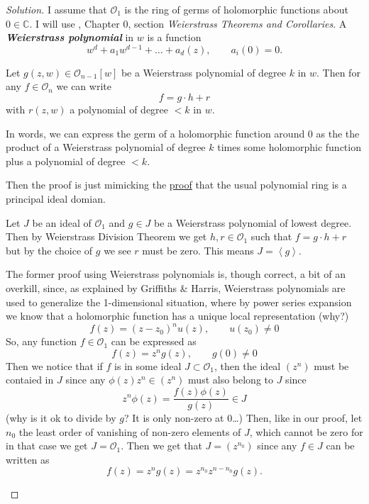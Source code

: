 \begin{proof}[Solution]\leavevmode
	I assume that $\mathcal{O}_1$ is the ring of germs of holomorphic functions about $0\in\mathbb{C}$. I will use \cite{gri}, Chapter 0, section \textit{Weierstrass Theorems and Corollaries}. A \textit{\textbf{Weierstrass polynomial}} in $w$ is a function
	\[w^d+a_1w^{d-1}+\ldots+a_d(z),\qquad a_i(0)=0.\]

\begin{thm}\leavevmode
	Let $g(z,w)\in\mathcal{O}_{n-1}[w]$ be a Weierstrass polynomial of degree $k$ in $w$. Then for any $f\in\mathcal{O}_n$ we can write
	\[f=g\cdot h+r\]
	with $r(z,w)$ a polynomial of degree $<k$ in $w$.
\end{thm}
In words, we can express the germ of a holomorphic function around 0 as the the product of a Weierstrass polynomial of degree $k$ times some holomorphic function plus a polynomial of degree $<k$.

Then the proof is just mimicking the \href{https://proofwiki.org/wiki/Polynomial_Forms_over_Field_form_Principal_Ideal_Domain}{proof} that the usual polynomial ring is a principal ideal domian.

Let $J$ be an ideal of $\mathcal{O}_1$ and $g\in J$ be a Weierstrass polynomial of lowest degree. Then by Weierstrass Division Theorem we get $h,r\in\mathcal{O}_1$ such that $f=g\cdot h+r$ but by the choice of $g$ we see $r$ must be zero. This means $J=\left<g\right> $.

\begin{remark}
	The former proof using Weierstrass polynomials is, though correct, a bit of an overkill, since, as explained by Griffiths \& Harris, Weierstrass polynomials are used to generalize the 1-dimensional situation, where by power series expansion we know that a holomorphic function has a unique local representation {\color{8}(why?)}
	\[f(z)=(z-z_0)^nu(z),\qquad u(z_0)\neq 0\]
       So, any function $f\in\mathcal{O}_1$ can be expressed as
 \[f(z)=z^ng(z),\qquad g(0)\neq 0\]
Then we notice that if $f$ is in some ideal $J \subset \mathcal{O}_1$, then the ideal $(z^n)$ must be contaied in $J$ since any $\phi(z)z^n \in(z^n)$ must also belong to $J$ since
\[z^n\phi(z)=\frac{f(z)\phi(z)}{g(z)}\in J\]{\color{8}(why is it ok to divide by $g$? It is only non-zero at 0…)} Then, like in our proof, let $n_0$ the least order of vanishing of non-zero elements of $J$, which cannot be zero for in that case we get $J=\mathcal{O}_1$. Then we get that $J=(z^{n_0})$ since any $f\in J$ can be written as
\[f(z)=z^ng(z)=z^{n_0}z^{n-n_0}g(z).\]
\end{remark}
\end{proof}

